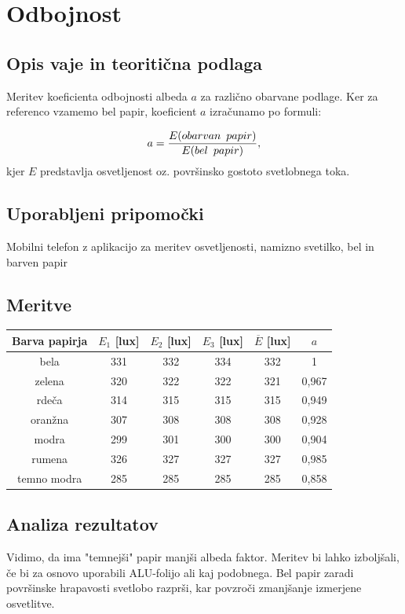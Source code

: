 \documentclass[12pt]{article}
\begin{document}
\newpage
\section{Odbojnost}
	\subsection*{Opis vaje in teoritična podlaga}
	Meritev koeficienta odbojnosti albeda $a$ za različno obarvane podlage. Ker za referenco
	vzamemo bel papir, koeficient $a$ izračunamo po formuli:

	\begin{equation}
		a = \frac{E(obarvan \enskip papir)}{E(bel \enskip papir)},
	\end{equation}
	kjer $E$ predstavlja osvetljenost oz. površinsko gostoto svetlobnega toka. 
	\subsection*{Uporabljeni pripomočki}
	Mobilni telefon z aplikacijo za meritev osvetljenosti, namizno svetilko, bel in barven
	papir

	\subsection*{Meritve}
	\begin{table}[!h]
		\centering
		\begin{tabular}{|c|c|c|c|c|c|}
		\hline
		Barva papirja & $E_1$ [lux] & $E_2$ [lux] 	& $E_3$ [lux] 	& $\overline{E}$ [lux] 	& $a$   \\ \hline
		bela          & 331			& 332			& 334			& 332 					& 1     \\ \hline
		zelena        & 320 		& 322 			& 322 			& 321 					& 0,967 \\ \hline
		rdeča         & 314 		& 315 			& 315 			& 315 					& 0,949 \\ \hline
		oranžna       & 307 		& 308 			& 308 			& 308 					& 0,928 \\ \hline
		modra         & 299 		& 301 			& 300 			& 300 					& 0,904 \\ \hline
		rumena        & 326 		& 327 			& 327 			& 327 					& 0,985 \\ \hline
		temno modra   & 285 		& 285 			& 285 			& 285 					& 0,858 \\ \hline
		\end{tabular}
	\end{table}

	\subsection*{Analiza rezultatov}
	Vidimo, da ima "temnejši" papir manjši albeda faktor. Meritev bi lahko izboljšali, če 
	bi za osnovo uporabili ALU-folijo ali kaj podobnega. Bel papir zaradi površinske 
	hrapavosti svetlobo razprši, kar povzroči zmanjšanje izmerjene osvetlitve.
\end{document}
